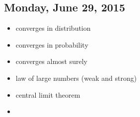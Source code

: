 \subsection{Monday, June 29, 2015}

\begin{itemize}
\item converges in distribution
\item converges in probability
\item converges almost surely
\item law of large numbers (weak and strong)
\item central limit theorem
\item {}
\end{itemize}

